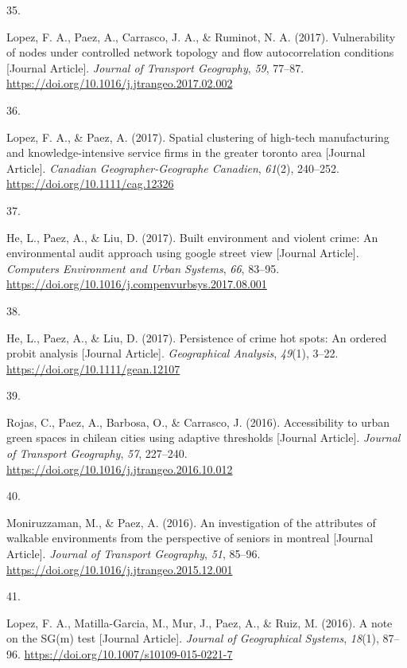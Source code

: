 \documentclass[10pt,a4paper,]{twentysecondcv}
\newlength{\csllabelwidth}
\newcommand{\CSLLeftMargin}[1]{\parbox[t]{\csllabelwidth}{#1}}
\newcommand{\CSLRightInline}[1]{\parbox[t]{\linewidth - \csllabelwidth}{#1}}
\begin{document}
\leavevmode{}%
\CSLLeftMargin{35. }%
\CSLRightInline{Lopez, F. A., Paez, A., Carrasco, J. A., \& Ruminot, N.
A. (2017). Vulnerability of nodes under controlled network topology and
flow autocorrelation conditions {[}Journal Article{]}. \emph{Journal of
Transport Geography}, \emph{59}, 77--87.
\url{https://doi.org/10.1016/j.jtrangeo.2017.02.002}}

\leavevmode{}%
\CSLLeftMargin{36. }%
\CSLRightInline{Lopez, F. A., \& Paez, A. (2017). Spatial clustering of
high-tech manufacturing and knowledge-intensive service firms in the
greater toronto area {[}Journal Article{]}. \emph{Canadian
Geographer-Geographe Canadien}, \emph{61}(2), 240--252.
\url{https://doi.org/10.1111/cag.12326}}

\leavevmode{}%
\CSLLeftMargin{37. }%
\CSLRightInline{He, L., Paez, A., \& Liu, D. (2017). Built environment
and violent crime: An environmental audit approach using google street
view {[}Journal Article{]}. \emph{Computers Environment and Urban
Systems}, \emph{66}, 83--95.
\url{https://doi.org/10.1016/j.compenvurbsys.2017.08.001}}

\leavevmode{}%
\CSLLeftMargin{38. }%
\CSLRightInline{He, L., Paez, A., \& Liu, D. (2017). Persistence of
crime hot spots: An ordered probit analysis {[}Journal Article{]}.
\emph{Geographical Analysis}, \emph{49}(1), 3--22.
\url{https://doi.org/10.1111/gean.12107}}

\leavevmode{}%
\CSLLeftMargin{39. }%
\CSLRightInline{Rojas, C., Paez, A., Barbosa, O., \& Carrasco, J.
(2016). Accessibility to urban green spaces in chilean cities using
adaptive thresholds {[}Journal Article{]}. \emph{Journal of Transport
Geography}, \emph{57}, 227--240.
\url{https://doi.org/10.1016/j.jtrangeo.2016.10.012}}

\leavevmode{}%
\CSLLeftMargin{40. }%
\CSLRightInline{Moniruzzaman, M., \& Paez, A. (2016). An investigation
of the attributes of walkable environments from the perspective of
seniors in montreal {[}Journal Article{]}. \emph{Journal of Transport
Geography}, \emph{51}, 85--96.
\url{https://doi.org/10.1016/j.jtrangeo.2015.12.001}}

\leavevmode{}%
\CSLLeftMargin{41. }%
\CSLRightInline{Lopez, F. A., Matilla-Garcia, M., Mur, J., Paez, A., \&
Ruiz, M. (2016). A note on the SG(m) test {[}Journal Article{]}.
\emph{Journal of Geographical Systems}, \emph{18}(1), 87--96.
\url{https://doi.org/10.1007/s10109-015-0221-7}}
\end{document}
